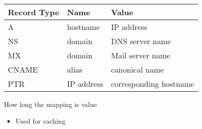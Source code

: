 \begin{itemize}
\begin{itemize}
\begin{itemize}
                        \begin{tabular}{l l l}
                            Record Type & Name & Value\\
                            \hline
                            A & hostname & IP address\\
                            NS & domain & DNS server name\\
                            MX & domain & Mail server name\\
                            CNAME & alias & canonical name\\
                            PTR & IP address & corresponding hostname
                        \end{tabular}
                     How long the mapping is value
                        \begin{itemize}
                            \item Used for caching
                        \end{itemize}
                \end{itemize}
        \end{itemize}
\end{itemize}

